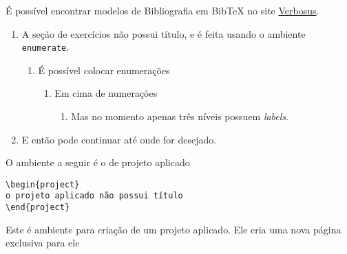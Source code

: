 \begin{knowledge}
É possível encontrar modelos de Bibliografia em BibTeX no site \href{https://verbosus.com/bibtex-style-examples.html}{Verbosus}.
\end{knowledge}

\exercise

\begin{enumerate}
\item A seção de exercícios não possui título, e é feita usando o ambiente \verb|enumerate|.
\begin{enumerate}
\item É possível colocar enumerações
\begin{enumerate}
\item Em cima de numerações
\begin{enumerate}
\item Mas no momento apenas três níveis possuem \textit{labels}.
\end{enumerate}
\end{enumerate}
\end{enumerate}

\item E então pode continuar até onde for desejado.
\end{enumerate}

O ambiente a seguir é o de projeto aplicado
\begin{verbatim}
\begin{project}
o projeto aplicado não possui título
\end{project}
\end{verbatim}

\begin{project}
Este é ambiente para criação de um projeto aplicado. Ele cria uma nova página exclusiva para ele

\end{project}


